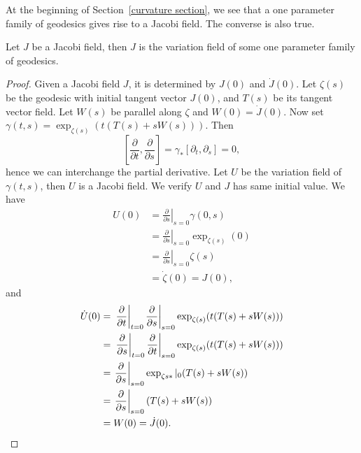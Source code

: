 At the beginning of Section~\ref{curvature section}, we see that a one parameter family of geode\-sics gives rise to a Jacobi field.
The converse is also true.
\begin{prop}
    Let $J$ be a Jacobi field, then $J$ is the variation field of some one parameter family of geodesics.
\end{prop}
\begin{proof}
    Given a Jacobi field $J$, it is determined by $J(0)$ and $\dot{J}(0)$.
    Let $\zeta(s)$ be the geodesic with initial tangent vector $J(0)$, and $T(s)$ be its tangent vector field.
    Let $W(s)$ be parallel along $\zeta$ and $W(0)=\dot{J}(0)$.
    Now set $\gamma(t,s)=\exp_{\zeta(s)}(t(T(s)+sW(s)))$.
    Then
    \[\left[\frac{\partial}{\partial{t}},\frac{\partial}{\partial{s}}\right]=\gamma_*[\partial_t,\partial_s]=0,\]
    hence we can interchange the partial derivative.
    Let $U$ be the variation field of $\gamma(t,s)$, then $U$ is a Jacobi field.
    We verify $U$ and $J$ has same initial value.
    We have
    \begin{align*}
        U(0)&=\left.\frac{\partial{}}{\partial{s}}\right|_{s=0}\gamma(0,s)\\
        &=\left.\frac{\partial{}}{\partial{s}}\right|_{s=0}\exp_{\zeta(s)}(0)\\
        &=\left.\frac{\partial{}}{\partial{s}}\right|_{s=0}\zeta(s)\\
        &=\dot\zeta(0)=J(0),
    \end{align*}
    and
    \begin{align*}
        \dot{U}(0)&=\left.\left.\frac{\partial}{\partial{t}}\right|_{t=0}\frac{\partial}{\partial{s}}\right|_{s=0}\exp_{\zeta(s)}(t(T(s)+sW(s)))\\
        &=\left.\left.\frac{\partial}{\partial{s}}\right|_{t=0}\frac{\partial}{\partial{t}}\right|_{s=0}\exp_{\zeta(s)}(t(T(s)+sW(s)))\\
        &=\left.\frac{\partial}{\partial{s}}\right|_{s=0}\exp_{\zeta{s}*}|_0(T(s)+sW(s))\\
        &=\left.\frac{\partial}{\partial{s}}\right|_{s=0}(T(s)+sW(s))\\
        &=W(0)=\dot{J}(0).\qedhere
    \end{align*}
\end{proof}

